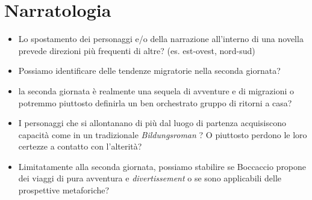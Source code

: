 \section{Narratologia}\label{narratologia}

\begin{itemize}
\tightlist
\item
  Lo spostamento dei personaggi e/o della narrazione all'interno di una
  novella prevede direzioni più frequenti di altre? (es. est-ovest,
  nord-sud)
\item
  Possiamo identificare delle tendenze migratorie nella seconda
  giornata?
\item
  la seconda giornata è realmente una sequela di avventure e di
  migrazioni o potremmo piuttosto definirla un ben orchestrato gruppo di
  ritorni a casa?
\item
  I personaggi che si allontanano di più dal luogo di partenza
  acquisiscono capacità come in un tradizionale \emph{Bildungsroman} ? O
  piuttosto perdono le loro certezze a contatto con l'alterità?
\item
  Limitatamente alla seconda giornata, possiamo stabilire se Boccaccio
  propone dei viaggi di pura avventura e \emph{divertissement} o se sono
  applicabili delle prospettive metaforiche?
\end{itemize}
